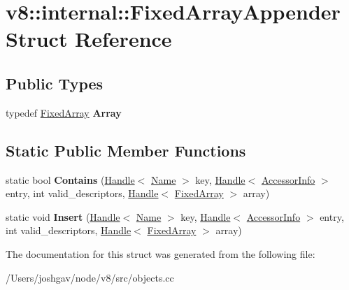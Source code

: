 \hypertarget{structv8_1_1internal_1_1_fixed_array_appender}{}\section{v8\+:\+:internal\+:\+:Fixed\+Array\+Appender Struct Reference}
\label{structv8_1_1internal_1_1_fixed_array_appender}
\subsection*{Public Types}
\begin{DoxyCompactItemize}
\item 
typedef \hyperlink{classv8_1_1internal_1_1_fixed_array}{Fixed\+Array} {\bfseries Array}\hypertarget{structv8_1_1internal_1_1_fixed_array_appender_adb3f59da224416e436b53ec67a601bd1}{}\label{structv8_1_1internal_1_1_fixed_array_appender_adb3f59da224416e436b53ec67a601bd1}

\end{DoxyCompactItemize}
\subsection*{Static Public Member Functions}
\begin{DoxyCompactItemize}
\item 
static bool {\bfseries Contains} (\hyperlink{classv8_1_1internal_1_1_handle}{Handle}$<$ \hyperlink{classv8_1_1internal_1_1_name}{Name} $>$ key, \hyperlink{classv8_1_1internal_1_1_handle}{Handle}$<$ \hyperlink{classv8_1_1internal_1_1_accessor_info}{Accessor\+Info} $>$ entry, int valid\+\_\+descriptors, \hyperlink{classv8_1_1internal_1_1_handle}{Handle}$<$ \hyperlink{classv8_1_1internal_1_1_fixed_array}{Fixed\+Array} $>$ array)\hypertarget{structv8_1_1internal_1_1_fixed_array_appender_a70f29f6facceb66de5ea74bda9af2cc3}{}\label{structv8_1_1internal_1_1_fixed_array_appender_a70f29f6facceb66de5ea74bda9af2cc3}

\item 
static void {\bfseries Insert} (\hyperlink{classv8_1_1internal_1_1_handle}{Handle}$<$ \hyperlink{classv8_1_1internal_1_1_name}{Name} $>$ key, \hyperlink{classv8_1_1internal_1_1_handle}{Handle}$<$ \hyperlink{classv8_1_1internal_1_1_accessor_info}{Accessor\+Info} $>$ entry, int valid\+\_\+descriptors, \hyperlink{classv8_1_1internal_1_1_handle}{Handle}$<$ \hyperlink{classv8_1_1internal_1_1_fixed_array}{Fixed\+Array} $>$ array)\hypertarget{structv8_1_1internal_1_1_fixed_array_appender_ac4fd1ec46faaefbcb8bd9200687986df}{}\label{structv8_1_1internal_1_1_fixed_array_appender_ac4fd1ec46faaefbcb8bd9200687986df}

\end{DoxyCompactItemize}


The documentation for this struct was generated from the following file\+:\begin{DoxyCompactItemize}
\item 
/\+Users/joshgav/node/v8/src/objects.\+cc\end{DoxyCompactItemize}
